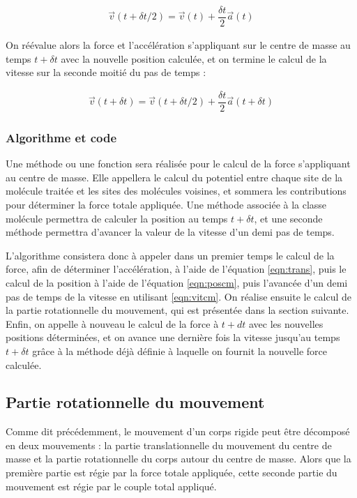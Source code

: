 \documentclass[12pt]{article}
\begin{document}
\begin{eqnarray} \label{eqn:vitcm}
\vec{v}\left(t+\delta t/2\right)=\vec{v}\left(t\right)+\dfrac{\delta t}{2}\vec{a}\left(t\right)
\end{eqnarray} 

On réévalue alors la force et l'accélération s'appliquant sur le centre de masse au temps $t+\delta t$ avec la nouvelle position calculée, et on termine le calcul de la vitesse sur la seconde moitié du pas de temps :

\begin{eqnarray}
\vec{v}\left(t+\delta t\right)=\vec{v}\left(t+\delta t/2\right)+\dfrac{\delta t}{2}\vec{a}\left(t+\delta t\right)
\end{eqnarray}

      \subsubsection{Algorithme et code}
      
Une méthode ou une fonction sera réalisée pour le calcul de la force s'appliquant au centre de masse. Elle appellera le calcul du potentiel entre chaque site de la molécule traitée et les sites des molécules voisines, et sommera les contributions pour déterminer la force totale appliquée. Une méthode associée à la classe molécule permettra de calculer la position au temps $t+\delta t$, et une seconde méthode permettra d'avancer la valeur de la vitesse d'un demi pas de temps. 

L'algorithme consistera donc à appeler dans un premier temps le calcul de la force, afin de déterminer l'accélération, à l'aide de l'équation \ref{eqn:trans}, puis le calcul de la position à l'aide de l'équation \ref{eqn:poscm}, puis l'avancée d'un demi pas de temps de la vitesse en utilisant \ref{eqn:vitcm}. On réalise ensuite le calcul de la partie rotationnelle du mouvement, qui est présentée dans la section suivante. Enfin, on appelle à nouveau le calcul de la force à $t+dt$ avec les nouvelles positions déterminées, et on avance une dernière fois la vitesse jusqu'au temps $t+\delta t$ grâce à la méthode déjà définie à laquelle on fournit la nouvelle force calculée.

      \subsection{Partie rotationnelle du mouvement}

Comme dit précédemment, le mouvement d'un corps rigide peut être décomposé en deux mouvements : la partie translationnelle du mouvement du centre de masse et la partie rotationnelle du corps autour du centre de masse. Alors que la première partie est régie par la force totale appliquée, cette seconde partie du mouvement est régie par le couple total appliqué.
\end{document}
